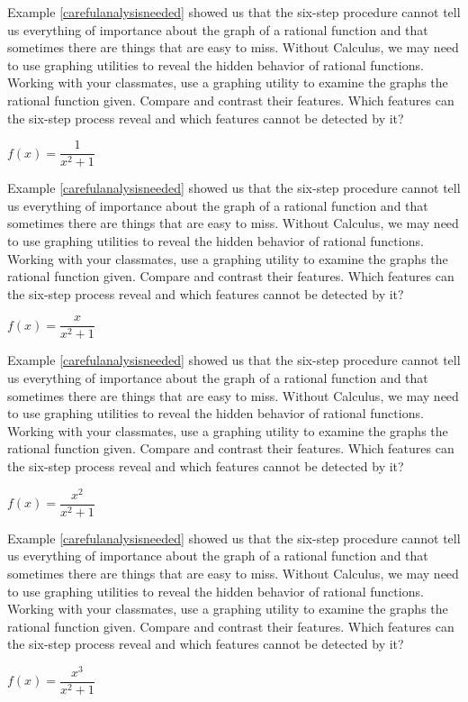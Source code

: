 \documentclass{ximera}
\begin{document}
\begin{problem}\label{rationalneedcalcfirst}
Example \ref{carefulanalysisneeded} showed us that the six-step procedure cannot tell us everything of importance about the graph of a rational function and that sometimes there are things that are easy to miss.  Without Calculus, we may need to use graphing utilities to reveal the hidden behavior of rational functions.  Working with your classmates, use a graphing utility to examine the graphs the rational function given.  Compare and contrast their features.  Which features can the six-step process reveal and which features cannot be detected by it?   

$f(x) = \dfrac{1}{x^{2} + 1}$
\end{problem}

\begin{problem}
Example \ref{carefulanalysisneeded} showed us that the six-step procedure cannot tell us everything of importance about the graph of a rational function and that sometimes there are things that are easy to miss.  Without Calculus, we may need to use graphing utilities to reveal the hidden behavior of rational functions.  Working with your classmates, use a graphing utility to examine the graphs the rational function given.  Compare and contrast their features.  Which features can the six-step process reveal and which features cannot be detected by it?   

$f(x) = \dfrac{x}{x^{2} + 1}$ 
\end{problem}

\begin{problem}
Example \ref{carefulanalysisneeded} showed us that the six-step procedure cannot tell us everything of importance about the graph of a rational function and that sometimes there are things that are easy to miss.  Without Calculus, we may need to use graphing utilities to reveal the hidden behavior of rational functions.  Working with your classmates, use a graphing utility to examine the graphs the rational function given.  Compare and contrast their features.  Which features can the six-step process reveal and which features cannot be detected by it?  

$f(x) = \dfrac{x^{2}}{x^{2} + 1}$ 
\end{problem}

\begin{problem}\label{rationalneedcalclast}
Example \ref{carefulanalysisneeded} showed us that the six-step procedure cannot tell us everything of importance about the graph of a rational function and that sometimes there are things that are easy to miss.  Without Calculus, we may need to use graphing utilities to reveal the hidden behavior of rational functions.  Working with your classmates, use a graphing utility to examine the graphs the rational function given.  Compare and contrast their features.  Which features can the six-step process reveal and which features cannot be detected by it?   

$f(x) = \dfrac{x^{3}}{x^{2} + 1}$
\end{problem}
\end{document}

